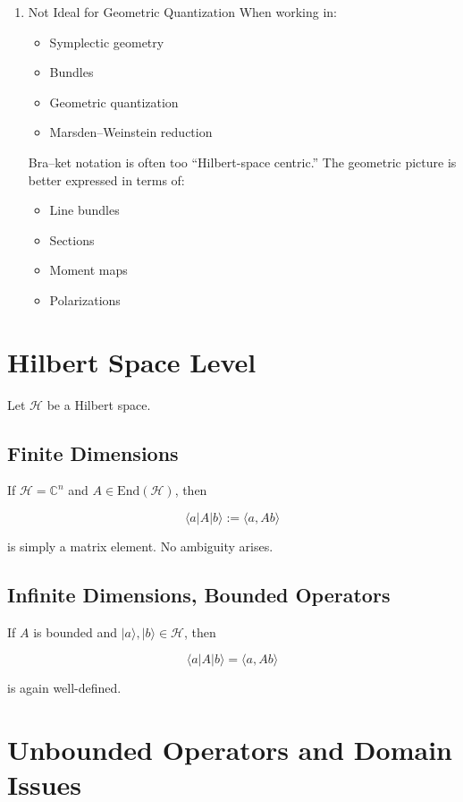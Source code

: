 \documentclass[12pt]{article}
\begin{document}
\begin{enumerate}
It encourages formal calculation over structural analysis.
   \item
Not Ideal for Geometric Quantization
When working in:
\begin{itemize}
\item
  Symplectic geometry
\item
  Bundles
\item
  Geometric quantization
\item
  Marsden--Weinstein reduction
\end{itemize}
Bra--ket notation is often too ``Hilbert-space centric.''
The geometric picture is better expressed in terms of:
\begin{itemize}
\item
  Line bundles
\item
  Sections
\item
  Moment maps
\item
  Polarizations
\end{itemize}
\end{enumerate}

\section{Hilbert Space Level}

Let $\mathcal H$ be a Hilbert space.

\subsection{Finite Dimensions}

If $\mathcal H = \mathbb C^n$ and $A \in \mathrm{End}(\mathcal H)$, then

\[
\langle a|A|b\rangle := \langle a, Ab\rangle
\]

is simply a matrix element. No ambiguity arises.

\subsection{Infinite Dimensions, Bounded Operators}

If $A$ is bounded and $|a\rangle, |b\rangle \in \mathcal H$, then

\[
\langle a|A|b\rangle = \langle a, Ab\rangle
\]

is again well-defined.

\section{Unbounded Operators and Domain Issues}
\end{document}
